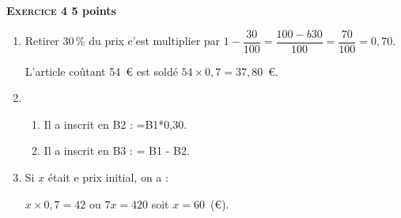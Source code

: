 \textbf{\textsc{Exercice 4} \hfill 5 points}

\medskip 

%

\begin{enumerate}
\item %
Retirer 30\,\% du prix c'est multiplier par $1 - \dfrac{30}{100} = \dfrac{100 - b30}{100} = \dfrac{70}{100} = 0,70$.

L'article coûtant 54~\euro{} est soldé $54 \times 0,7 = 37,80$~\euro. 
\item %


	\begin{enumerate}
		\item %
Il a inscrit en B2 : =B1*0,30. 
		\item %
Il a inscrit en B3 : = B1 - B2. 
	\end{enumerate}
\item %
Si $x$ était e prix initial, on a :

$x \times 0,7 = 42$ ou $7x = 420$ soit $x = 60$~(\euro).  
\end{enumerate}

\bigskip


